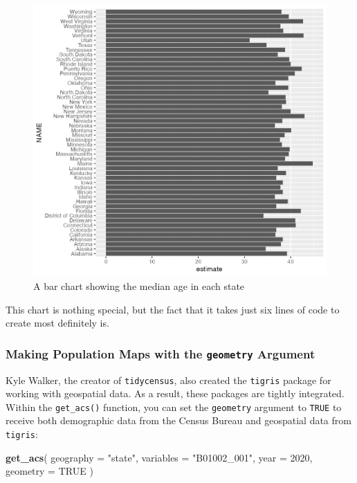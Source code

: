 \documentclass[
]{book}
\newenvironment{Shaded}{\begin{snugshade}}{\end{snugshade}}
\newcommand{\AttributeTok}[1]{\textcolor[rgb]{0.13,0.29,0.53}{#1}}
\newcommand{\ConstantTok}[1]{\textcolor[rgb]{0.56,0.35,0.01}{#1}}
\newcommand{\DecValTok}[1]{\textcolor[rgb]{0.00,0.00,0.81}{#1}}
\newcommand{\FunctionTok}[1]{\textcolor[rgb]{0.13,0.29,0.53}{\textbf{#1}}}
\newcommand{\NormalTok}[1]{#1}
\newcommand{\StringTok}[1]{\textcolor[rgb]{0.31,0.60,0.02}{#1}}
\begin{document}
\begin{figure}
\includegraphics[width=1\linewidth]{accessing-data_files/figure-latex/median-age-chart-1} \caption{A bar chart showing the median age in each state}\label{fig:median-age-chart}
\end{figure}

This chart is nothing special, but the fact that it takes just six lines of code to create most definitely is.

\hypertarget{making-population-maps-with-the-geometry-argument}{%
\subsubsection*{\texorpdfstring{Making Population Maps with the \texttt{geometry} Argument}{Making Population Maps with the geometry Argument}}\label{making-population-maps-with-the-geometry-argument}}

Kyle Walker, the creator of \texttt{tidycensus}, also created the \texttt{tigris} package for working with geospatial data. As a result, these packages are tightly integrated. Within the \texttt{get\_acs()} function, you can set the \texttt{geometry} argument to \texttt{TRUE} to receive both demographic data from the Census Bureau and geospatial data from \texttt{tigris}:

\begin{Shaded}
\begin{Highlighting}[]
\FunctionTok{get\_acs}\NormalTok{(}
  \AttributeTok{geography =} \StringTok{"state"}\NormalTok{,}
  \AttributeTok{variables =} \StringTok{"B01002\_001"}\NormalTok{,}
  \AttributeTok{year =} \DecValTok{2020}\NormalTok{,}
  \AttributeTok{geometry =} \ConstantTok{TRUE}
\NormalTok{)}
\end{Highlighting}
\end{Shaded}
\end{document}
